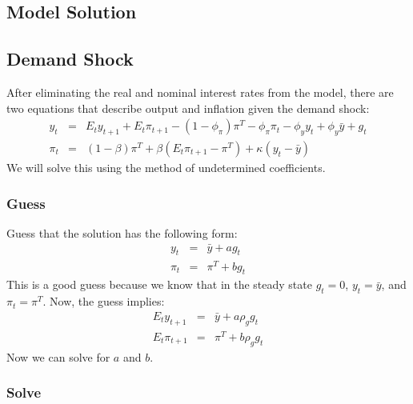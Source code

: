 \documentclass[12pt,fleqn]{article}
\newcommand{\EE}{\begin{eqnarray}}
\newcommand{\FF}{\end{eqnarray}}
\begin{document}
\begin{appendix}
\section{Model Solution}

\subsection{Demand Shock}
\label{sec:solution_demand}

After eliminating the real and nominal interest rates from the model, there are two equations that describe output and inflation given the demand shock:
	\EE
	y_t & = & E_t y_{t+1} + E_t\pi_{t+1}  - (1-\phi_{\pi})\pi^T - \phi_{\pi}\pi_t - \phi_y y_t + \phi_y \bar{y} +  g_t\\
	\pi_t & = & (1-\beta) \pi^T + \beta \left( E_t\pi_{t+1} - \pi^T\right)  + \kappa (y_t -\bar{y})
	\FF
We will solve this using the method of undetermined coefficients.

\subsubsection{Guess}

Guess that the solution has the following form:
	\EE
	y_t & = & \bar{y} + a g_t\\
	\pi_t & = & \pi^T + b g_t
	\FF
This is a good guess because we know that in the steady state $g_t = 0$, $y_t = \bar{y}$, and $\pi_t = \pi^T$. Now, the guess implies:
	\EE
	E_ty_{t+1} & = & \bar{y} + a \rho_gg_t\\
	E_t\pi_{t+1} & = & \pi^T + b \rho_gg_t
	\FF
Now we can solve for $a$ and $b$.	


\subsubsection{Solve}


\end{appendix}
\end{document}
